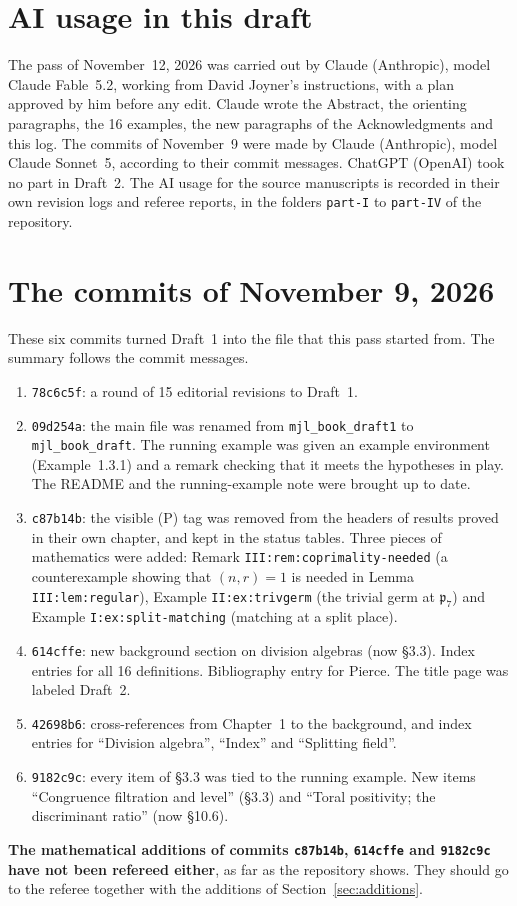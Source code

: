 \documentclass[12pt,letterpaper]{article}
\begin{document}
\section{AI usage in this draft}
The pass of November~12, 2026 was carried out by Claude (Anthropic), model Claude Fable~5.2, working from David Joyner's instructions, with a plan approved by him before any edit. Claude wrote the Abstract, the orienting paragraphs, the 16 examples, the new paragraphs of the Acknowledgments and this log. The commits of November~9 were made by Claude (Anthropic), model Claude Sonnet~5, according to their commit messages. ChatGPT (OpenAI) took no part in Draft~2. The AI usage for the source manuscripts is recorded in their own revision logs and referee reports, in the folders \texttt{part-I} to \texttt{part-IV} of the repository.

\section{The commits of November 9, 2026}\label{sec:nov9}
These six commits turned Draft~1 into the file that this pass started from. The summary follows the commit messages.
\begin{enumerate}[leftmargin=*]
\item \texttt{78c6c5f}: a round of 15 editorial revisions to Draft~1.
\item \texttt{09d254a}: the main file was renamed from \texttt{mjl\_book\_draft1} to \texttt{mjl\_book\_draft}. The running example was given an example environment (Example~1.3.1) and a remark checking that it meets the hypotheses in play. The README and the running-example note were brought up to date.
\item \texttt{c87b14b}: the visible (P) tag was removed from the headers of results proved in their own chapter, and kept in the status tables. Three pieces of mathematics were added: Remark \texttt{III:rem:coprimality-needed} (a counterexample showing that $(n,r)=1$ is needed in Lemma \texttt{III:lem:regular}), Example \texttt{II:ex:trivgerm} (the trivial germ at $\mathfrak p_7$) and Example \texttt{I:ex:split-matching} (matching at a split place).
\item \texttt{614cffe}: new background section on division algebras (now \S3.3). Index entries for all 16 definitions. Bibliography entry for Pierce. The title page was labeled Draft~2.
\item \texttt{42698b6}: cross-references from Chapter~1 to the background, and index entries for ``Division algebra'', ``Index'' and ``Splitting field''.
\item \texttt{9182c9c}: every item of \S3.3 was tied to the running example. New items ``Congruence filtration and level'' (\S3.3) and ``Toral positivity; the discriminant ratio'' (now \S10.6).
\end{enumerate}
\textbf{The mathematical additions of commits \texttt{c87b14b}, \texttt{614cffe} and \texttt{9182c9c} have not been refereed either}, as far as the repository shows. They should go to the referee together with the additions of Section~\ref{sec:additions}.
\end{document}
